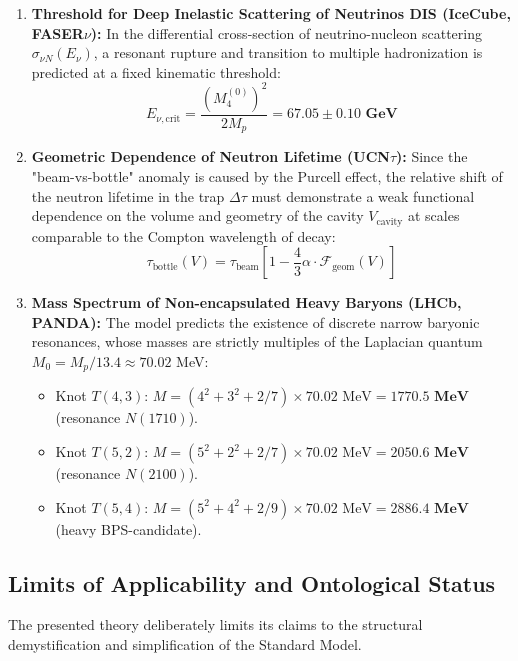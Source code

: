\documentclass[12pt,a4paper]{article}
\begin{document}
\begin{enumerate}
			\item \textbf{Threshold for Deep Inelastic Scattering of Neutrinos DIS (IceCube, FASER$\nu$):}
			In the differential cross-section of neutrino-nucleon scattering $\sigma_{\nu N}(E_\nu)$, a resonant rupture and transition to multiple hadronization is predicted at a fixed kinematic threshold:
			\begin{equation}
				E_{\nu, \text{crit}} = \frac{(M_4^{(0)})^2}{2 M_p} = \mathbf{67.05 \pm 0.10 \text{ GeV}}
			\end{equation}
			
			\item \textbf{Geometric Dependence of Neutron Lifetime (UCN$\tau$):}
			Since the "beam-vs-bottle" anomaly is caused by the Purcell effect, the relative shift of the neutron lifetime in the trap $\Delta\tau$ must demonstrate a weak functional dependence on the volume and geometry of the cavity $V_{\text{cavity}}$ at scales comparable to the Compton wavelength of decay:
			\begin{equation}
				\tau_{\text{bottle}}(V) = \tau_{\text{beam}} \left[ 1 - \frac{4}{3}\alpha \cdot \mathcal{F}_{\text{geom}}(V) \right]
			\end{equation}
			
			\item \textbf{Mass Spectrum of Non-encapsulated Heavy Baryons (LHCb, PANDA):}
			The model predicts the existence of discrete narrow baryonic resonances, whose masses are strictly multiples of the Laplacian quantum $M_0 = M_p / 13.4 \approx 70.02$ MeV:
			\begin{itemize}
				\item Knot $T(4,3)$: $M = (4^2 + 3^2 + 2/7) \times 70.02 \text{ MeV} = \mathbf{1770.5 \text{ MeV}}$ (resonance $N(1710)$).
				\item Knot $T(5,2)$: $M = (5^2 + 2^2 + 2/7) \times 70.02 \text{ MeV} = \mathbf{2050.6 \text{ MeV}}$ (resonance $N(2100)$).
				\item Knot $T(5,4)$: $M = (5^2 + 4^2 + 2/9) \times 70.02 \text{ MeV} = \mathbf{2886.4 \text{ MeV}}$ (heavy BPS-candidate).
			\end{itemize}
		\end{enumerate}
		
		\subsection{Limits of Applicability and Ontological Status}
		The presented theory deliberately limits its claims to the structural demystification and simplification of the Standard Model. 
		
\end{document}
